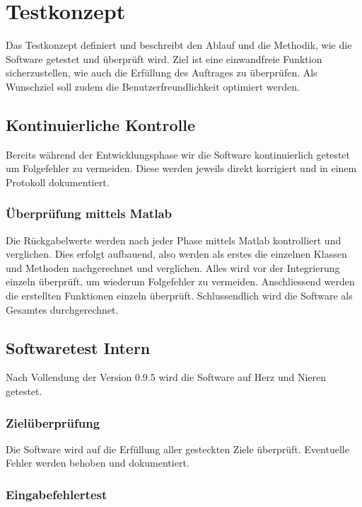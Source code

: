 \section{Testkonzept} \label{sec:Testkonzept}

Das Testkonzept definiert und beschreibt den Ablauf und die Methodik, wie die Software getestet und überprüft wird. Ziel ist eine einwandfreie Funktion sicherzustellen, wie auch die Erfüllung des Auftrages zu überprüfen. Als Wunschziel soll zudem die Benutzerfreundlichkeit optimiert werden.


\subsection{Kontinuierliche Kontrolle } \label{subsec:1}

Bereits während der Entwicklungsphase wir die Software kontinuierlich getestet um Folgefehler zu vermeiden. Diese werden jeweils direkt korrigiert und in einem Protokoll dokumentiert. 

\subsubsection{Überprüfung mittels Matlab  } \label{subsubsec:1}

Die Rückgabelwerte werden nach jeder Phase mittels Matlab kontrolliert und verglichen.
Dies erfolgt aufbauend, also werden als erstes die einzelnen Klassen und Methoden nachgerechnet und verglichen. Alles wird vor der Integrierung einzeln überprüft, um wiederum Folgefehler zu vermeiden. Anschliessend werden die erstellten Funktionen einzeln überprüft. Schlussendlich wird die Software als Gesamtes durchgerechnet.


\subsection{Softwaretest Intern} \label{subsec:2}

Nach Vollendung der Version 0.9.5 wird die Software auf Herz und Nieren getestet.

\subsubsection{Zielüberprüfung} \label{subsubsec:1}

Die Software wird auf die Erfüllung aller gesteckten Ziele überprüft. Eventuelle Fehler werden behoben und dokumentiert.

\subsubsection{Eingabefehlertest } \label{subsubsec:2}
 
